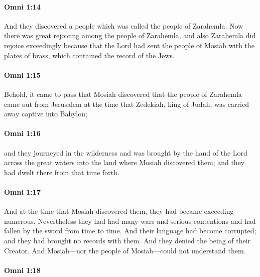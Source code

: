 		\paragraph{Omni 1:14} %
			\label{OMNI-1-14}

			And they discovered a people which was called the people of Zarahemla.
			Now there was great rejoicing among the people of Zarahemla,
			and also Zarahemla did rejoice exceedingly
			because that the Lord had sent the people of Mosiah
			with the plates of brass, which contained the record of the Jews.

		\paragraph{Omni 1:15} %
			\label{OMNI-1-15}

			Behold, it came to pass that Mosiah discovered
			that the people of Zarahemla came out from Jerusalem at the time
			that Zedekiah, king of Judah, was carried away captive into Babylon;

		\paragraph{Omni 1:16} %
			\label{OMNI-1-16}

			and they journeyed in the wilderness
			and was brought by the hand of the Lord across the great waters
			into the land where Mosiah discovered them;
			and they had dwelt there from that time forth.

		\paragraph{Omni 1:17} %
			\label{OMNI-1-17}

			And at the time that Mosiah discovered them,
			they had became exceeding numerous.
			Nevertheless they had had many wars and serious contentions
			and had fallen by the sword from time to time.
			And their language had become corrupted;
			and they had brought no records with them.
			And they denied the being of their Creator.
			And Mosiah---nor the people of Mosiah---could not understand them.

		\paragraph{Omni 1:18} %
			\label{OMNI-1-18}


